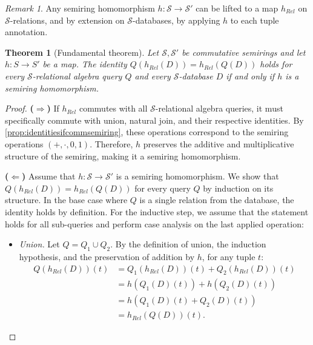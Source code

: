\documentclass[oneside, 11pt]{amsbook}
\theoremstyle{plain}
\newtheorem{thm}{Theorem}[section]
\theoremstyle{definition}
\theoremstyle{remark}
\newtheorem*{remark}{Remark}
\begin{document}
\begin{remark}
    Any semiring homomorphism $h: \mathcal{S} \to \mathcal{S}'$ can be lifted to a map $h_{Rel}$ on $\mathcal{S}$-relations, and by extension on $\mathcal{S}$-databases, by applying $h$ to each tuple annotation.
\end{remark}

\begin{thm}[Fundamental theorem]
    \label{thm:fundamental}
    Let $\mathcal{S}, \mathcal{S}'$ be commutative semirings and let $h: S \to S'$ be a map. The identity $Q(h_{Rel}(D)) = h_{Rel}(Q(D))$ holds for every $\mathcal{S}$-relational algebra query $Q$ and every $\mathcal{S}$-database $D$ if and only if $h$ is a semiring homomorphism.
\end{thm}
\begin{proof}
    \textbf{($\Rightarrow$)}
    If $h_{Rel}$ commutes with all $\mathcal{S}$-relational algebra queries, it must specifically commute with union, natural join, and their respective identities. By \autoref{prop:identitiesifcommsemiring}, these operations correspond to the semiring operations $(+, \cdot, 0, 1)$. Therefore, $h$ preserves the additive and multiplicative structure of the semiring, making it a semiring homomorphism.

    \textbf{($\Leftarrow$)}
    Assume that $h : \mathcal{S} \to \mathcal{S}'$ is a semiring homomorphism. We show that $Q(h_{Rel}(D)) = h_{Rel}(Q(D))$ for every query $Q$ by induction on its structure. In the base case where $Q$ is a single relation from the database, the identity holds by definition. For the inductive step, we assume that the statement holds for all sub-queries and perform case analysis on the last applied operation:

    \begin{itemize}
        \item \emph{Union.}
              Let $Q = Q_1 \cup Q_2$. By the definition of union, the induction hypothesis, and the preservation of addition by $h$, for any tuple $t$:
              \begin{align*}
                  Q(h_{Rel}(D))(t) & = Q_1(h_{Rel}(D))(t) + Q_2(h_{Rel}(D))(t) \\
                                   & = h(Q_1(D)(t)) + h(Q_2(D)(t))             \\
                                   & = h(Q_1(D)(t) + Q_2(D)(t))                \\
                                   & = h_{Rel}(Q(D))(t).
              \end{align*}


\end{itemize}
\end{proof}
\end{document}
